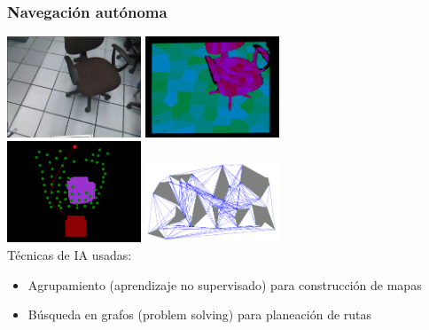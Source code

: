 \documentclass[10pt,spanish,aspectratio=1610]{beamer}
\begin{document}
\begin{frame}\frametitle{Navegación autónoma}
  \centering
  \includegraphics[width=0.3\textwidth]{Figures/VQ1.png}
  \includegraphics[width=0.3\textwidth]{Figures/VQ2.png}\\
  \includegraphics[width=0.3\textwidth]{Figures/VQ3.png}
  \includegraphics[width=0.3\textwidth]{Figures/VisibilityGraph.png}\\
  Técnicas de IA usadas:
  \begin{itemize}
  \item Agrupamiento (aprendizaje no supervisado) para construcción de mapas
  \item Búsqueda en grafos (problem solving) para planeación de rutas
  \end{itemize}
\end{frame}
\end{document}
